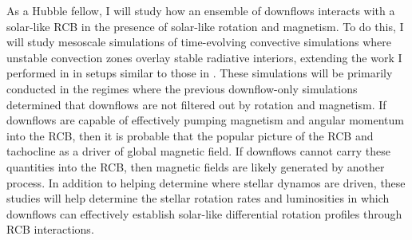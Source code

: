 \documentclass[11pt, preprint, hmargin=1in, vmargin=1in]{aastex62}
\begin{document}
%

As a Hubble fellow, I will study how an ensemble of downflows interacts with a solar-like RCB in the presence of solar-like rotation and magnetism.
To do this, I will study mesoscale simulations of time-evolving convective simulations where unstable convection zones overlay stable radiative interiors, extending the work I performed in \citep{anders&brown2017, anders&all2019} in setups similar to those in \citep{kapyla&all2017}. 
These simulations will be primarily conducted in the regimes where the previous downflow-only simulations determined that downflows are not filtered out by rotation and magnetism.
If downflows are capable of effectively pumping magnetism and angular momentum into the RCB, then it is probable that the popular picture of the RCB and tachocline as a driver of global magnetic field.
If downflows cannot carry these quantities into the RCB, then magnetic fields are likely generated by another process.
In addition to helping determine where stellar dynamos are driven, these studies will help determine the stellar rotation rates and luminosities in which downflows can effectively establish solar-like differential rotation profiles through RCB interactions.
\end{document}
